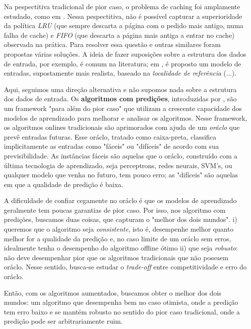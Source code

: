  Na pespectitiva tradicional de pior caso, o problema de caching foi amplamente estudado, como em \textcite{Achlioptas00}. Nessa pespectitiva, não é possível capturar a superioridade da política \emph{LRU} (que sempre descarta a página com o pedido mais antigo, numa falha de cache) e \emph{FIFO} (que descarta a página mais antiga a entrar no cache) observada na prática. Para resolver essa questão e outras similares foram propostas várias soluções. A ideia de fazer suposições sobre a estrutura dos dados de entrada, por exemplo, é comum na literatura; em \textcite{Albers02}, é proposto um modelo de entradas, supostamente mais realista, baseado na \emph{localidade de referência} (...).

 Aqui, seguimos uma direção alternativa e não supomos nada sobre a estrutura dos dados de entrada. Os \textbf{algoritmos com predições}, introduzidas por \textcite{Lykouris18}, são um framework "para além do pior caso" que utilizam a crescente capacidade dos modelos de aprendizado para melhorar e analisar os algoritmos. Nesse framework, os algoritmos onlines tradicionais são aprimorados com ajuda de um \emph{oráclo} que prevê entradas futuras. Esse oráclo, tratado como caixa-preta, classifica implicitamente as entradas como "fáceis" ou "difíceis" de acordo com sua previsibilidade. As instâncias fáceis são aquelas que o oráclo, construído com a última tecnologia de aprendizado, seja perceptrons, redes neurais, SVM's, ou qualquer modelo que venha no futuro, tem pouco erro; as "difíceis" são aquelas em que a qualidade de predição é baixa. 

 A dificuldade de confiar cegamente no oráclo é que os modelos de aprendizado geralmente tem poucas garantias de pior caso. Por isso, nos algoritmo com predições, buscamos duas coisas, que capturam o "melhor dos dois mundos". i) queremos que o algoritmo seja \emph{consistente}, isto é, desempenhe melhor quanto melhor for a qualidade da predição e, no caso limite de um oráclo sem erros, idealmente tenha o desempenho do algoritmo offline ótimo ii) que seja \emph{robusto}: não deve desempenhar pior que os algoritmos tradicionais que não possuem oráclo. Nesse sentido, busca-se estudar o \emph{trade-off} entre competitividade e erro do oráclo.

Então, com os algoritmos aumentados, buscamos obter o melhor dos dois mundos: um algoritmo que desempenha bem no caso otimista, onde a predição tem erro baixo e se mantém robusto no sentido do pior caso tradicional, onde a predição pode ser arbitrariamente ruim. 

